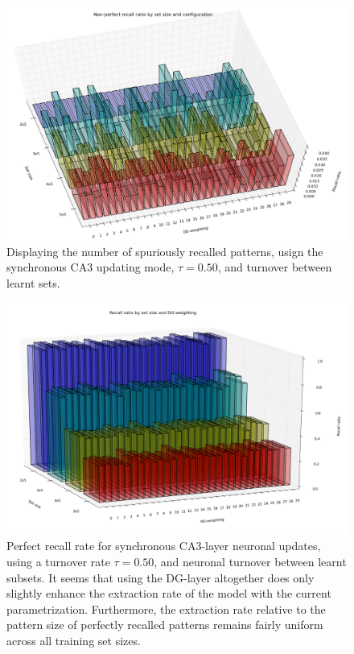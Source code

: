 \begin{figure}
    \centering
    \includegraphics[width=13cm]{fig/DGWs/cut/non_perfect_recall_by_dgw_sync_tm0_50_cut}
    \caption{Displaying the number of spuriously recalled patterns, usign the synchronous CA3 updating mode, $\tau=0.50$, and turnover between learnt sets.}
    \label{fig:non_perfect_recall_by_dgw_sync_tm0_50}
\end{figure}

\begin{figure}
    \centering
    \includegraphics[width=13cm]{fig/DGWs/cut/avg_recall_ratio_by_dgw_async_tm0_50_cut}
    \caption{Perfect recall rate for synchronous CA3-layer neuronal updates, using a turnover rate $\tau=0.50$, and neuronal turnover between learnt subsets. It seems that using the DG-layer altogether does only slightly enhance the extraction rate of the model with the current parametrization. Furthermore, the extraction rate relative to the pattern size of perfectly recalled patterns remains fairly uniform across all training set sizes.}
    \label{fig:avg_recall_ratio_by_dgw_async_tm0_50}
\end{figure}

